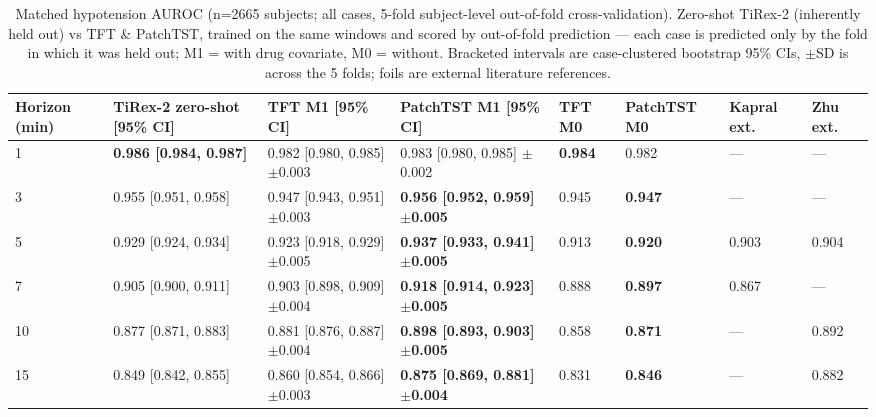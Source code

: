 \documentclass[10pt]{article}
\begin{document}
\begin{table}[H]\centering\footnotesize
\caption{Matched hypotension AUROC (n=2665 subjects; all cases, 5-fold subject-level out-of-fold cross-validation). Zero-shot TiRex-2 (inherently held out) vs TFT \& PatchTST, trained on the same windows and scored by out-of-fold prediction --- each case is predicted only by the fold in which it was held out; M1 = with drug covariate, M0 = without. Bracketed intervals are case-clustered bootstrap 95\% CIs, $\pm$SD is across the 5 folds; foils are external literature references.}
\begin{adjustbox}{max width=\textwidth}
\begin{tabular}{llllllll}
\toprule
\textbf{Horizon (min)} & \textbf{TiRex-2 zero-shot [95\% CI]} & \textbf{TFT M1 [95\% CI]} & \textbf{PatchTST M1 [95\% CI]} & \textbf{TFT M0} & \textbf{PatchTST M0} & \textbf{Kapral ext.} & \textbf{Zhu ext.} \\
\midrule
1 & \textbf{0.986 [0.984, 0.987]} & 0.982 [0.980, 0.985] $\pm$0.003 & 0.983 [0.980, 0.985] $\pm$0.002 & \textbf{0.984} & 0.982 & --- & --- \\
3 & 0.955 [0.951, 0.958] & 0.947 [0.943, 0.951] $\pm$0.003 & \textbf{0.956 [0.952, 0.959] $\pm$0.005} & 0.945 & \textbf{0.947} & --- & --- \\
5 & 0.929 [0.924, 0.934] & 0.923 [0.918, 0.929] $\pm$0.005 & \textbf{0.937 [0.933, 0.941] $\pm$0.005} & 0.913 & \textbf{0.920} & 0.903 & 0.904 \\
7 & 0.905 [0.900, 0.911] & 0.903 [0.898, 0.909] $\pm$0.004 & \textbf{0.918 [0.914, 0.923] $\pm$0.005} & 0.888 & \textbf{0.897} & 0.867 & --- \\
10 & 0.877 [0.871, 0.883] & 0.881 [0.876, 0.887] $\pm$0.004 & \textbf{0.898 [0.893, 0.903] $\pm$0.005} & 0.858 & \textbf{0.871} & --- & 0.892 \\
15 & 0.849 [0.842, 0.855] & 0.860 [0.854, 0.866] $\pm$0.003 & \textbf{0.875 [0.869, 0.881] $\pm$0.004} & 0.831 & \textbf{0.846} & --- & 0.882 \\
\bottomrule
\end{tabular}
\end{adjustbox}
\end{table}
\end{document}
